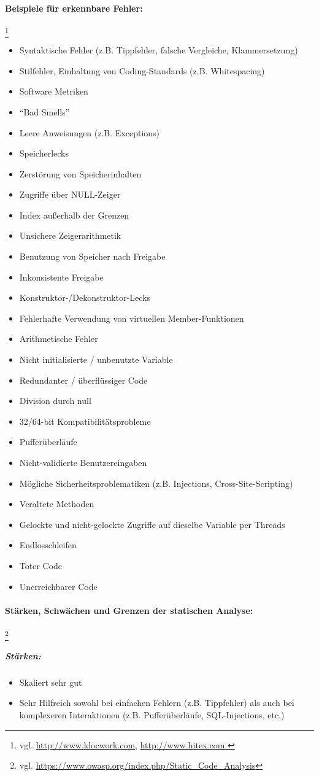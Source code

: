 \paragraph{Beispiele für erkennbare Fehler:}\footnote{vgl. \url{http://www.klocwork.com}, \url{http://www.hitex.com }}
\begin{itemize}
\item Syntaktische Fehler (z.B. Tippfehler, falsche Vergleiche, Klammersetzung)
\item Stilfehler, Einhaltung von Coding-Standards (z.B. Whitespacing)
\item Software Metriken
\item ``Bad Smells''
\item Leere Anweisungen (z.B. Exceptions)
\item Speicherlecks
\item Zerstörung von Speicherinhalten
\item Zugriffe über NULL-Zeiger
\item Index außerhalb der Grenzen
\item Unsichere Zeigerarithmetik
\item Benutzung von Speicher nach Freigabe
\item Inkonsistente Freigabe
\item Konstruktor-/Dekonstruktor-Lecks
\item Fehlerhafte Verwendung von virtuellen Member-Funktionen
\item Arithmetische Fehler
\item Nicht initialisierte / unbenutzte Variable
\item Redundanter / überflüssiger Code
\item Division durch null
\item 32/64-bit Kompatibilitätsprobleme
\item Pufferüberläufe
\item Nicht-validierte Benutzereingaben
\item Mögliche Sicherheitsproblematiken (z.B. Injections, Cross-Site-Scripting)
\item Veraltete Methoden
\item Gelockte und nicht-gelockte Zugriffe auf dieselbe Variable per Threads
\item Endlosschleifen
\item Toter Code
\item Unerreichbarer Code
\end{itemize}

\paragraph{Stärken, Schwächen und Grenzen der statischen Analyse:}\footnote{vgl. \url{https://www.owasp.org/index.php/Static_Code_Analysis}}
\subparagraph{Stärken:}
\begin{itemize}
\item Skaliert sehr gut
\item Sehr Hilfreich sowohl bei einfachen Fehlern (z.B. Tippfehler) als auch bei komplexeren Interaktionen (z.B. Pufferüberläufe, SQL-Injections, etc.)
\end{itemize}

